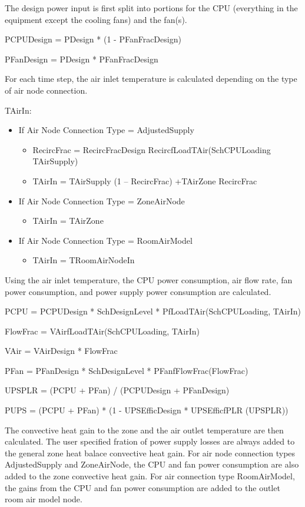The design power input is first split into portions for the CPU (everything in the equipment except the cooling fans) and the fan(s).

PCPUDesign = PDesign * (1 - PFanFracDesign)

PFanDesign = PDesign * PFanFracDesign

For each time step, the air inlet temperature is calculated depending on the type of air node connection.

TAirIn:

\begin{itemize}
    \tightlist
  \item
    If Air Node Connection Type = AdjustedSupply
    \begin{itemize}
      \item RecircFrac = RecircFracDesign \* RecircfLoadTAir(SchCPULoading TAirSupply)
      \item TAirIn = TAirSupply \* (1 – RecircFrac) +TAirZone \* RecircFrac
    \end{itemize}
  \item
    If Air Node Connection Type = ZoneAirNode
    \begin{itemize}
      \item   TAirIn = TAirZone
    \end{itemize}
  \item
    If Air Node Connection Type = RoomAirModel
    \begin{itemize}
      \item TAirIn = TRoomAirNodeIn
    \end{itemize}
\end{itemize}

Using the air inlet temperature, the CPU power consumption, air flow rate, fan power consumption, and power supply power consumption are calculated.

PCPU = PCPUDesign * SchDesignLevel * PfLoadTAir(SchCPULoading, TAirIn)

FlowFrac = VAirfLoadTAir(SchCPULoading, TAirIn)

VAir = VAirDesign * FlowFrac

PFan = PFanDesign * SchDesignLevel * PFanfFlowFrac(FlowFrac)

UPSPLR = (PCPU + PFan) / (PCPUDesign + PFanDesign)

PUPS = (PCPU + PFan) * (1 - UPSEfficDesign * UPSEfficfPLR (UPSPLR))

The convective heat gain to the zone and the air outlet temperature are then calculated. The user specified fration of power supply losses are always added to the general zone heat balace convective heat gain. For air node connection types AdjustedSupply and ZoneAirNode, the CPU and fan power consumption are also added to the zone convective heat gain. For air connection type RoomAirModel, the gains from the CPU and fan power consumption are added to the outlet room air model node.

